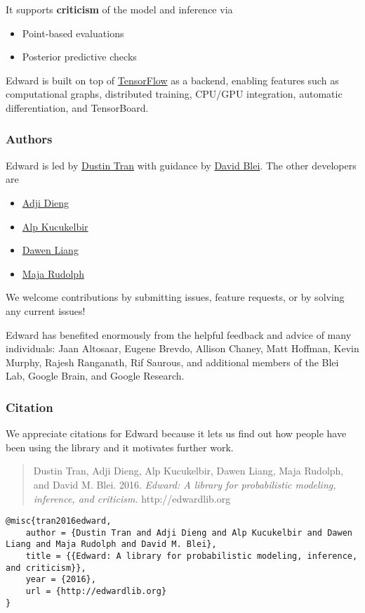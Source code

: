 It supports \textbf{criticism} of the model and inference via
\begin{itemize}
\item Point-based evaluations
\item Posterior predictive checks
\end{itemize}

Edward is built on top of
\href{https://www.tensorflow.org}{TensorFlow} as a backend, enabling
features such as computational graphs, distributed training, CPU/GPU
integration, automatic differentiation, and TensorBoard.

\subsubsection{Authors}

Edward is led by \href{http://dustintran.com}{Dustin Tran} with guidance
by \href{http://www.cs.columbia.edu/~blei/}{David Blei}. The other developers
are
\begin{itemize}
  \item \href{http://stat.columbia.edu/~diengadji/}{Adji Dieng}
  \item \href{http://www.proditus.com/}{Alp Kucukelbir}
  \item \href{http://www.ee.columbia.edu/~dliang/}{Dawen Liang}
  \item \href{http://maja-rita-rudolph.com/}{Maja Rudolph}
\end{itemize}
We welcome contributions by submitting issues, feature requests, or by solving
any current issues!

Edward has benefited enormously from the helpful feedback and advice
of many individuals: Jaan Altosaar, Eugene Brevdo, Allison Chaney, Matt
Hoffman, Kevin Murphy, Rajesh Ranganath, Rif Saurous, and additional
members of the Blei Lab, Google Brain, and Google Research.

\subsubsection{Citation}

We appreciate citations for Edward because it lets us find out how
people have been using the library and it motivates further work.

\begin{quote}
Dustin Tran, Adji Dieng, Alp Kucukelbir, Dawen Liang, Maja Rudolph, and David M.
Blei. 2016.
\emph{Edward: A library for probabilistic modeling, inference, and criticism. }
http://edwardlib.org
\end{quote}

\begin{lstlisting}[class=JSON]
@misc{tran2016edward,
    author = {Dustin Tran and Adji Dieng and Alp Kucukelbir and Dawen Liang and Maja Rudolph and David M. Blei},
    title = {{Edward: A library for probabilistic modeling, inference, and criticism}},
    year = {2016},
    url = {http://edwardlib.org}
}
\end{lstlisting}
